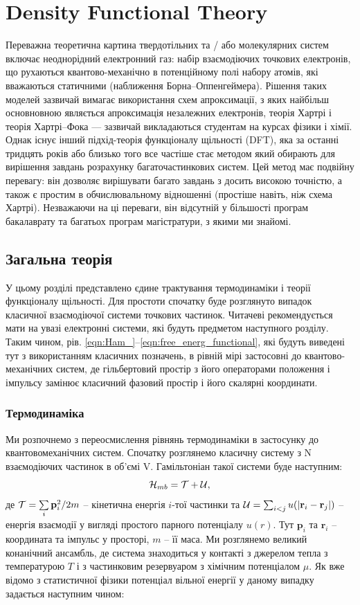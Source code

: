 \chapter{Density Functional Theory}
Переважна теоретична картина твердотільних та / або молекулярних систем включає неоднорідний електронний газ: набір взаємодіючих точкових електронів, що рухаються квантово-механічно в потенційному полі набору атомів, які вважаються статичними (наближення Борна–Оппенгеймера). Рішення таких моделей зазвичай вимагає використання схем апроксимації, з яких найбільш основновною являється апроксимація незалежних електронів, теорія Хартрі і теорія Хартрі–Фока — зазвичай викладаються студентам на курсах фізики і хімії. Однак існує інший підхід-теорія функціоналу щільності (DFT), яка за останні тридцять років або близько того все частіше стає методом який обирають для вирішення завдань розрахунку багаточастинкових систем. Цей метод має подвійну перевагу: він дозволяє вирішувати багато завдань з досить високою точністю, а також є простим в обчислювальному відношенні (простіше навіть, ніж схема Хартрі). Незважаючи на ці переваги, він відсутній у більшості програм бакалаврату та багатьох програм магістратури, з якими ми знайомі.
\section{Загальна теорія}
У цьому розділі представлено єдине трактування термодинаміки і теорії функціоналу щільності. Для простоти спочатку буде розглянуто випадок класичної взаємодіючої системи точкових частинок. Читачеві рекомендується мати на увазі електронні системи, які будуть предметом наступного розділу. Таким чином, рів. \ref{eqn:Ham_}--\ref{eqn:free_energ_functional}, які будуть виведені тут з використанням класичних позначень, в рівній мірі застосовні до квантово-механічних систем, де гільбертовий простір з його операторами положення і імпульсу замінює класичний фазовий простір і його скалярні координати.
\subsection{Термодинаміка}
Ми розпочнемо з переосмислення рівнянь термодинаміки в застосунку до квантовомеханічних систем. Спочатку розглянемо класичну систему з N взаємодіючих частинок в об'ємі V. Гамільтоніан такої системи буде наступним:
\begin{equation}
\label{eqn:Ham_}
	{\cal H}_{mb} = {\cal T} + {\cal U},
\end{equation}
де ${\cal T} = \sum\limits_{i}\textbf{p}_i^2/2m$ -- кінетична енергія $i$-тої частинки та ${\cal U} = \sum_{i < j}u(|\textbf{r}_i - \textbf{r}_j|)$ -- енергія взаємодії у вигляді простого парного потенціалу $u(r)$. Тут $\textbf{p}_i$ та $\textbf{r}_i$ -- координата та імпульс у просторі, $m$ -- її маса. 
Ми розглянемо великий конанічний ансамбль, де система знаходиться у контакті з джерелом тепла з температурою $T$ і з частинковим резервуаром з хімічним потенціалом $\mu$. Як вже відомо з статистичної фізики потенціал вільної енергії у даному випадку задається наступним чином:

